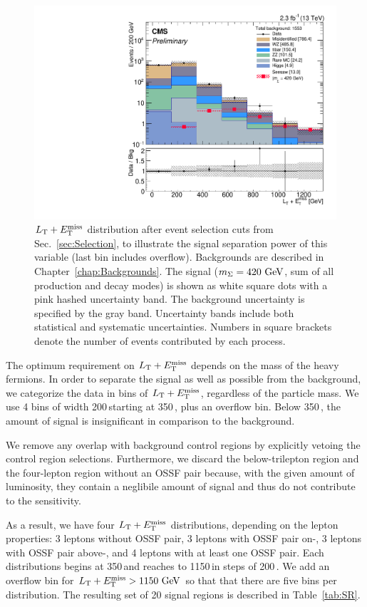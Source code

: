 \begin{figure}
\begin{center}
	\includegraphics[width=.7\textwidth]{Strategy/LT+MET}
	\caption{$L_\textrm{T} + E_{\mathrm{T}}^{\text{miss}}$ distribution after event selection cuts from Sec.~\ref{sec:Selection}, to illustrate the signal separation power of this variable (last bin includes overflow). Backgrounds are described in Chapter~{\ref{chap:Backgrounds}}. The signal ($m_\Sigma = 420\,\,\text{Ge\hspace{-.08em}V}$, sum of all production and decay modes) is shown as white square dots with a pink hashed uncertainty band. The background uncertainty is specified by the gray band. Uncertainty bands include both statistical and systematic uncertainties. Numbers in square brackets denote the number of events contributed by each process.
	\label{fig:Optimization}}
\end{center}
\end{figure}

The optimum requirement on $L_\textrm{T} + E_{\mathrm{T}}^{\text{miss}}$ depends on the mass of the heavy fermions. In order to separate the signal as well as possible from the background, we categorize the data in bins of $L_\textrm{T} + E_{\mathrm{T}}^{\text{miss}}$, regardless of the particle mass. We use 4 bins of width 200\,\GeV starting at 350\,\GeV, plus an overflow bin. Below 350\,\GeV, the amount of signal is insignificant in comparison to the background.

We remove any overlap with background control regions by explicitly vetoing the control region selections. Furthermore, we discard the below-\Z trilepton region and the four-lepton region without an OSSF pair because, with the given amount of luminosity, they contain a neglibile amount of signal and thus do not contribute to the sensitivity.

As a result, we have four $L_\textrm{T} + E_{\mathrm{T}}^{\text{miss}}$ distributions, depending on the lepton properties: 3 leptons without OSSF pair, 3 leptons with OSSF pair on-\Z, 3 leptons with OSSF pair above-\Z, and 4 leptons with at least one OSSF pair. Each distributions begins at 350\,\GeV and reaches to 1150\,\GeV in steps of 200\,\GeV. We add an overflow bin for $L_\textrm{T} + E_{\mathrm{T}}^{\text{miss}} > 1150\,\,\text{Ge\hspace{-.08em}V}$ so that that there are five bins per distribution. The resulting set of 20 signal regions is described in Table~\ref{tab:SR}.

